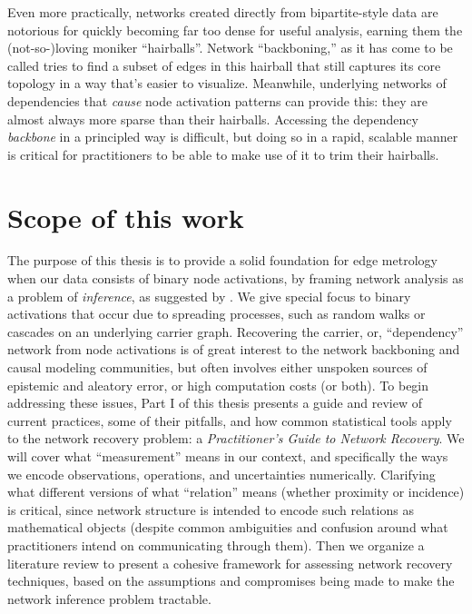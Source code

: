 \documentclass[%
	12pt,
		oneside,
		letterpaper
]{book}
\begin{document}
Even more practically, networks created directly from bipartite-style data are notorious for quickly becoming far too dense for useful analysis, earning them the (not-so-)loving moniker ``hairballs''.
Network ``backboning,'' as it has come to be called tries to find a subset of edges in this hairball that still captures its core topology in a way that's easier to visualize.\autocite{twostagealgorithm_Slater2009,backbonebipartiteprojections_Neal2014}
Meanwhile, underlying networks of dependencies that \emph{cause} node activation patterns can provide this: they are almost always more sparse than their hairballs.
Accessing the dependency \emph{backbone} in a principled way is difficult, but doing so in a rapid, scalable manner is critical for practitioners to be able to make use of it to trim their hairballs.

\section{Scope of this work}\label{scope-of-this-work}

The purpose of this thesis is to provide a solid foundation for edge metrology when our data consists of binary node activations, by framing network analysis as a problem of \emph{inference}, as suggested by \textcite{Statisticalinferencelinks_Peel2022}.
We give special focus to binary activations that occur due to spreading processes, such as random walks or cascades on an underlying carrier graph.
Recovering the carrier, or, ``dependency'' network from node activations is of great interest to the network backboning and causal modeling communities, but often involves either unspoken sources of epistemic and aleatory error, or high computation costs (or both).
To begin addressing these issues, Part I of this thesis presents a guide and review of current practices, some of their pitfalls, and how common statistical tools apply to the network recovery problem: a \emph{Practitioner's Guide to Network Recovery}.
We will cover what ``measurement'' means in our context, and specifically the ways we encode observations, operations, and uncertainties numerically.
Clarifying what different versions of what ``relation'' means (whether proximity or incidence) is critical, since network structure is intended to encode such relations as mathematical objects (despite common ambiguities and confusion around what practitioners intend on communicating through them).
Then we organize a literature review to present a cohesive framework for assessing network recovery techniques, based on the assumptions and compromises being made to make the network inference problem tractable.
\end{document}
